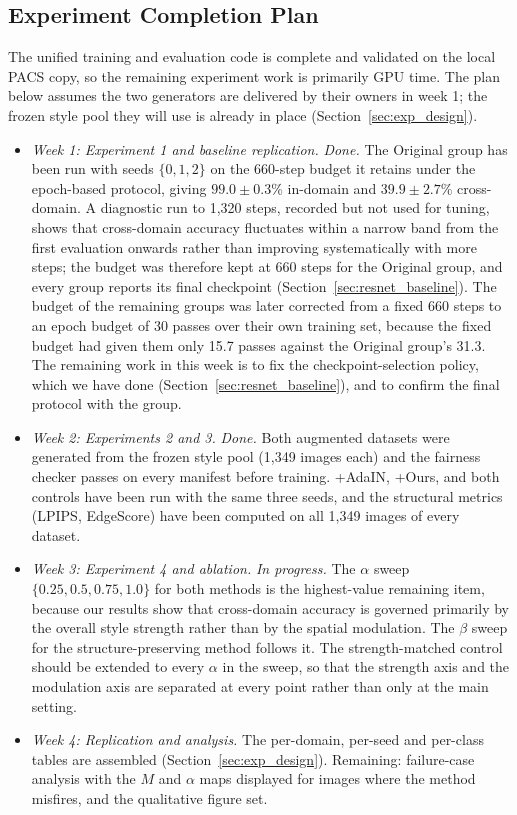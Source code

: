\subsection{Experiment Completion Plan}
\label{sec:completion_plan}

The unified training and evaluation code is complete and validated on the local PACS copy, so the remaining experiment work is primarily GPU time. The plan below assumes the two generators are delivered by their owners in week 1; the frozen style pool they will use is already in place (Section~\ref{sec:exp_design}).

\begin{itemize}
\item \textit{Week 1: Experiment 1 and baseline replication.} \textit{Done.} The Original group has been run with seeds $\{0,1,2\}$ on the 660-step budget it retains under the epoch-based protocol, giving $99.0\pm0.3\%$ in-domain and $39.9\pm2.7\%$ cross-domain. A diagnostic run to 1{,}320 steps, recorded but not used for tuning, shows that cross-domain accuracy fluctuates within a narrow band from the first evaluation onwards rather than improving systematically with more steps; the budget was therefore kept at 660 steps for the Original group, and every group reports its final checkpoint (Section~\ref{sec:resnet_baseline}). The budget of the remaining groups was later corrected from a fixed 660 steps to an epoch budget of 30 passes over their own training set, because the fixed budget had given them only 15.7 passes against the Original group's 31.3. The remaining work in this week is to fix the checkpoint-selection policy, which we have done (Section~\ref{sec:resnet_baseline}), and to confirm the final protocol with the group.
\item \textit{Week 2: Experiments 2 and 3.} \textit{Done.} Both augmented datasets were generated from the frozen style pool (1{,}349 images each) and the fairness checker passes on every manifest before training. +AdaIN, +Ours, and both controls have been run with the same three seeds, and the structural metrics (LPIPS, EdgeScore) have been computed on all 1{,}349 images of every dataset.
\item \textit{Week 3: Experiment 4 and ablation.} \textit{In progress.} The $\alpha$ sweep $\{0.25, 0.5, 0.75, 1.0\}$ for both methods is the highest-value remaining item, because our results show that cross-domain accuracy is governed primarily by the overall style strength rather than by the spatial modulation. The $\beta$ sweep for the structure-preserving method follows it. The strength-matched control should be extended to every $\alpha$ in the sweep, so that the strength axis and the modulation axis are separated at every point rather than only at the main setting.
\item \textit{Week 4: Replication and analysis.} The per-domain, per-seed and per-class tables are assembled (Section~\ref{sec:exp_design}). Remaining: failure-case analysis with the $M$ and $\alpha$ maps displayed for images where the method misfires, and the qualitative figure set.
\end{itemize}

